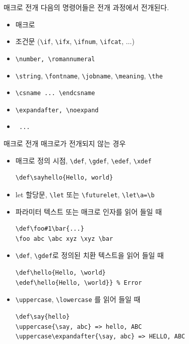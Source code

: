 \documentclass{beamer}
\begin{document}
%
\begin{frame}[fragile]{매크로 전개}
  다음의 명령어들은 전개 과정에서 전개된다.
  \begin{itemize}
  \item 매크로
  \item 조건문 (\verb+\if+, \verb+\ifx+, \verb+\ifnum+, \verb+\ifcat+, $\ldots$)
  \item \verb+\number, \romannumeral+
  \item \verb+\string+, \verb+\fontname+, \verb+\jobname+,
    \verb+\meaning+, \verb+\the+
  \item \verb+\csname ... \endcsname+
  \item \verb+\expandafter, \noexpand+
  \item \verb+ ... +
  \end{itemize}
\end{frame}


%
\begin{frame}[fragile]{매크로 전개}
  매크로가 전개되지 않는 경우
  \begin{itemize}
  \item 매크로 정의 시점, \verb+\def+, \verb+\gdef+, \verb+\edef+, \verb+\xdef+
\begin{Verbatim}[fontsize=\small, formatcom=\color{blue}]
\def\sayhello{Hello, world}
\end{Verbatim}
  \item let 할당문, \verb+\let+ 또는 \verb+\futurelet+,
  {\color{blue} \verb+\let\a=\b+}
  \item 파라미터 텍스트 또는 매크로 인자를 읽어 들일 때
\begin{Verbatim}[fontsize=\small, formatcom=\color{blue}]
\def\foo#1\bar{...}
\foo abc \abc xyz \xyz \bar
\end{Verbatim}
  \item \verb+\def+, \verb+\gdef+로 정의된 치환 텍스트을 읽어 들일 때
\begin{Verbatim}[fontsize=\small, formatcom=\color{blue}] 
\def\hello{Hello, \world}
\edef\hello{Hello, \world}} % Error
\end{Verbatim}
  \item \verb+\uppercase+, \verb+\lowercase+ 를 읽어 들일 때
\begin{Verbatim}[fontsize=\small, formatcom=\color{blue}]
\def\say{hello}
\uppercase{\say, abc} => hello, ABC
\uppercase\expandafter{\say, abc} => HELLO, ABC  
\end{Verbatim}
  \end{itemize}
\end{frame}
\end{document}
